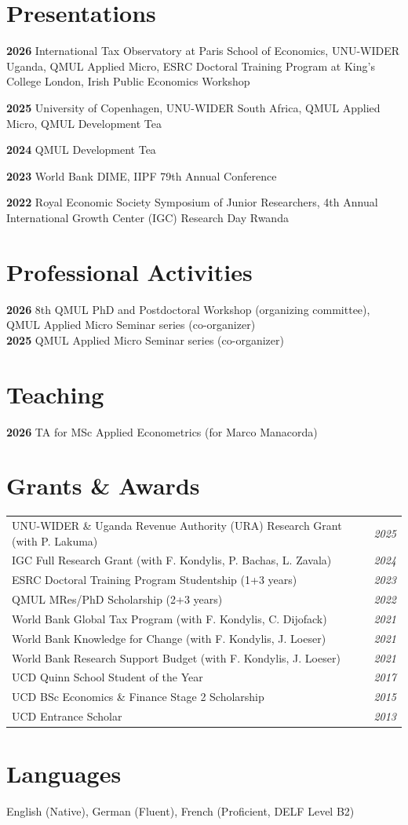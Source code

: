 \documentclass[letterpaper,10.9pt, roman]{article}
\begin{document}
\section{Presentations}
\textbf{2026}
International Tax Observatory at Paris School of Economics, UNU-WIDER Uganda, QMUL Applied Micro, ESRC Doctoral Training Program at King's College London, Irish Public Economics Workshop

\textbf{2025}
University of Copenhagen, UNU-WIDER South Africa, QMUL Applied Micro, QMUL Development Tea

\textbf{2024}
QMUL Development Tea

\textbf{2023}
World Bank DIME, IIPF 79th Annual Conference

\textbf{2022}
Royal Economic Society Symposium of Junior Researchers, 4th Annual International Growth Center (IGC) Research Day Rwanda

\section{Professional Activities}
\textbf{2026}
8th QMUL PhD and Postdoctoral Workshop (organizing committee), QMUL Applied Micro Seminar series (co-organizer)\\
\textbf{2025}
QMUL Applied Micro Seminar series (co-organizer)

\section{Teaching}
\textbf{2026} TA for MSc Applied Econometrics (for Marco Manacorda)

\section{Grants \& Awards} 

\begin{tabular*}{0.97\textwidth}{l@{\extracolsep{\fill}}r}
{UNU-WIDER \& Uganda Revenue Authority (URA) Research Grant (with P. Lakuma)} & \textit{\small2025}\\
{IGC Full Research Grant (with F. Kondylis, P. Bachas, L. Zavala)} & \textit{\small2024}\\
{ESRC Doctoral Training Program Studentship (1+3 years) } & \textit{\small2023}\\
{QMUL MRes/PhD Scholarship (2+3 years)} & \textit{\small2022}\\
{World Bank Global Tax Program (with F. Kondylis, C. Dijofack)} & \textit{\small2021}\\
{World Bank Knowledge for Change (with F. Kondylis, J. Loeser)} & \textit{\small2021}\\
{World Bank Research Support Budget (with F. Kondylis, J. Loeser)} & \textit{\small2021}\\
{UCD Quinn School Student of the Year} & \textit{\small2017}\\
{UCD BSc Economics \& Finance Stage 2 Scholarship} & \textit{\small2015}\\
{UCD Entrance Scholar}& \textit{\small2013}

\end{tabular*}

\section{Languages}

English (Native), German (Fluent), French (Proficient, DELF Level B2)
 
\end{document}
